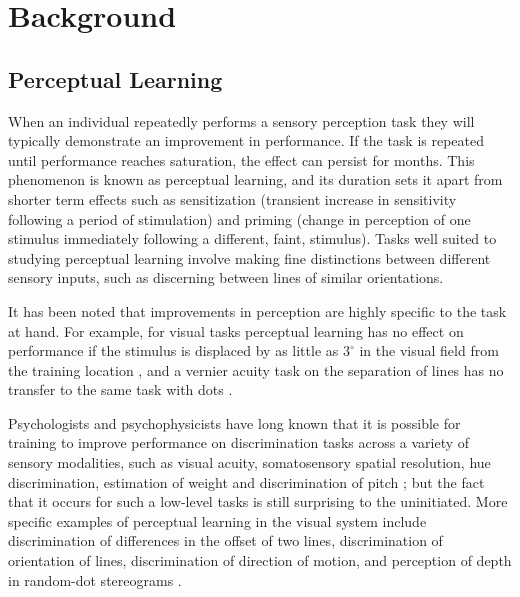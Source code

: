 \section{Background}
\label{ch:bg}

\subsection{Perceptual Learning}
\label{sec:bgpl}

When an individual repeatedly performs a sensory perception task they will typically demonstrate an improvement in performance.
If the task is repeated until performance reaches saturation, the effect can persist for months.
This phenomenon is known as perceptual learning, and its duration sets it apart from shorter term effects such as sensitization (transient increase in sensitivity following a period of stimulation) and priming (change in perception of one stimulus immediately following a different, faint, stimulus).
Tasks well suited to studying perceptual learning involve making fine distinctions between different sensory inputs, such as discerning between lines of similar orientations.

It has been noted that improvements in perception are highly specific to the task at hand.
For example, for visual tasks perceptual learning has no effect on performance if the stimulus is displaced by as little as $3^\circ$ in the visual field from the training location \cite{Gilbert1994}, 
and a vernier acuity task on the separation of lines has no transfer to the same task with dots \cite{Poggio1992}.


Psychologists and psychophysicists have long known that it is possible for training to improve performance on discrimination tasks across a variety of sensory modalities, such as visual acuity, somatosensory spatial resolution, hue discrimination, estimation of weight and discrimination of pitch \cite{Gilbert2001}; but the fact that it occurs for such a low-level tasks is still surprising to the uninitiated.
More specific examples of perceptual learning in the visual system include discrimination of differences in the offset of two lines, discrimination of orientation of lines, discrimination of direction of motion, and perception of depth in random-dot stereograms \cite{Gilbert2001,Fine2002}.

